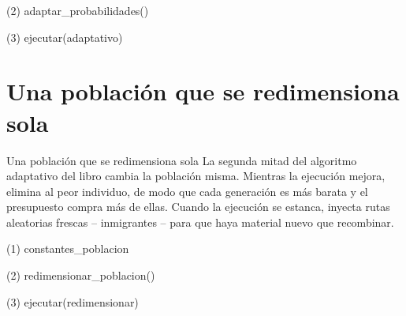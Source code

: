 \begin{frame}[fragile]{(2) adaptar\_probabilidades()}

\end{frame}

\begin{frame}[fragile]{(3) ejecutar(adaptativo)}

\end{frame}


\section{Una población que se redimensiona sola}

\begin{frame}{Una población que se redimensiona sola}
La segunda mitad del algoritmo adaptativo del libro cambia la población misma.
Mientras la ejecución mejora, elimina al peor individuo, de modo que cada generación es
más barata y el presupuesto compra más de ellas. Cuando la ejecución se estanca, inyecta rutas
aleatorias frescas -- inmigrantes -- para que haya material nuevo que recombinar.
\end{frame}

\begin{frame}[fragile]{(1) constantes\_poblacion}

\end{frame}

\begin{frame}[fragile]{(2) redimensionar\_poblacion()}

\end{frame}

\begin{frame}[fragile]{(3) ejecutar(redimensionar)}

\end{frame}

